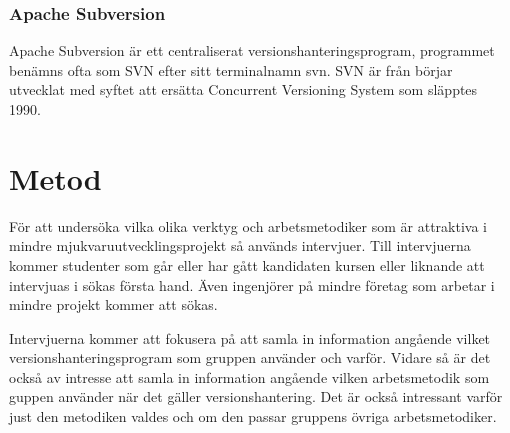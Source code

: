 \subsubsection{Apache Subversion}
Apache Subversion är ett centraliserat versionshanteringsprogram, programmet benämns ofta som SVN efter sitt terminalnamn svn. SVN är från börjar utvecklat med syftet att ersätta Concurrent Versioning System som släpptes 1990.\cite{wiki_cvs}\cite{VersionControlSvn}\cite{web_Svn}


\section{Metod}
För att undersöka vilka olika verktyg och arbetsmetodiker som är attraktiva i mindre mjukvaruutvecklingsprojekt så används intervjuer. Till intervjuerna kommer studenter som går eller har gått kandidaten kursen eller liknande att intervjuas i sökas första hand. Även ingenjörer på mindre företag som arbetar i mindre projekt kommer att sökas.


Intervjuerna kommer att fokusera på att samla in information angående vilket versionshanteringsprogram som gruppen använder och varför. Vidare så är det också av intresse att samla in information angående vilken arbetsmetodik som guppen använder när det gäller versionshantering. Det är också intressant varför just den metodiken valdes och om den passar gruppens övriga arbetsmetodiker.

